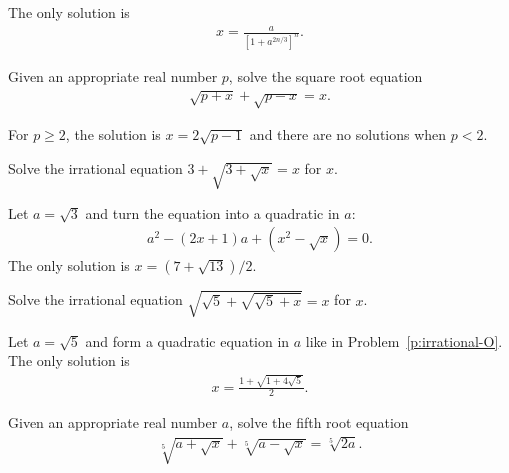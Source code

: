 \begin{solution}
    The only solution is
    \begin{align*}
        x=\frac{a}{\left[1+a^{2n/3}\right]^n}.
    \end{align*}
\end{solution}

\begin{question}\label{p:irrational-N}
    Given an appropriate real number $p$, solve the square root equation
    \begin{align*}
        \sqrt{p+x}+\sqrt{p-x}=x.
    \end{align*}
\end{question}

\begin{solution}
    For $p\geq 2$, the solution is $x=2\sqrt{p-1}$ and there are no solutions when $p<2$.
\end{solution}


\begin{question}\label{p:irrational-O}
    Solve the irrational equation $3+\sqrt{3+\sqrt{x}}=x$ for $x$.
\end{question}

\begin{solution}
    Let $a=\sqrt 3$ and turn the equation into a quadratic in $a$:
    \begin{align*}
        a^2 - (2x+1)a + (x^2-\sqrt x)=0.
    \end{align*}
    The only solution is $x=(7+\sqrt{13})/2$.
\end{solution}


\begin{question}\label{p:irrational-P}
    Solve the irrational equation $\sqrt{\sqrt{5}+\sqrt{\sqrt{5}+x}}=x$ for $x$.
\end{question}

\begin{solution}
    Let $a=\sqrt 5$ and form a quadratic equation in $a$ like in Problem~\ref{p:irrational-O}. The only solution is
    \begin{align*}
        x = \frac{1+\sqrt{1+4\sqrt{5}}}{2}.
    \end{align*}
\end{solution}

\begin{question}\label{p:irrational-Q}
    Given an appropriate real number $a$, solve the fifth root equation
    \begin{align*}
        \sqrt[5]{a+\sqrt{x}}+\sqrt[5]{a-\sqrt{x}}=\sqrt[5]{2a}.
    \end{align*}
\end{question}

